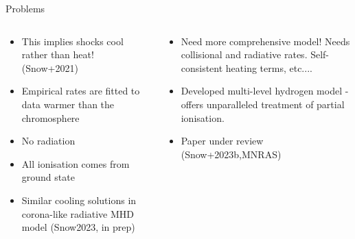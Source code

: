 \documentclass[10pt,aspectratio=169,usenames,dvipsnames]{beamer}
\begin{document}
\begin{frame}{Problems}
\begin{columns}
\begin{column}{0.5\textwidth}
\begin{itemize}
\item This implies shocks cool rather than heat! (Snow+2021)
\item Empirical rates are fitted to data warmer than the chromosphere
\item No radiation
\item All ionisation comes from ground state
\item Similar cooling solutions in corona-like radiative MHD model (Snow2023, in prep)  
\end{itemize}
\end{column}
\begin{column}{0.5\textwidth}
\begin{itemize}
\item Need more comprehensive model! Needs collisional and radiative rates. Self-consistent heating terms, etc.... 
\item Developed multi-level hydrogen model - offers unparalleled treatment of partial ionisation. 
\item Paper under review (Snow+2023b,MNRAS)
\end{itemize}
\end{column}
\end{columns}
\end{frame}

\end{document}
